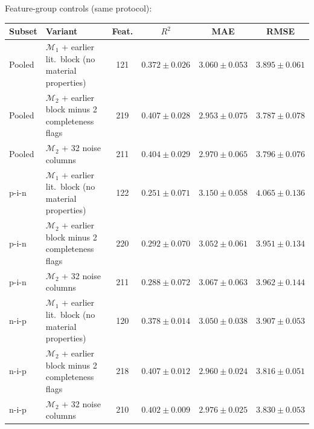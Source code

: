 \documentclass[10pt]{article}
\begin{document}
\noindent Feature-group controls (same protocol):\par\smallskip\begin{tabular}{llcccc}\toprule Subset & Variant & Feat. & $R^2$ & MAE & RMSE\\\midrule
Pooled & $\mathcal{M}_1$ + earlier lit.\ block (no material properties) & 121 & $0.372\pm0.026$ & $3.060\pm0.053$ & $3.895\pm0.061$\\
Pooled & $\mathcal{M}_2$ + earlier block minus 2 completeness flags & 219 & $0.407\pm0.028$ & $2.953\pm0.075$ & $3.787\pm0.078$\\
Pooled & $\mathcal{M}_2$ + 32 noise columns & 211 & $0.404\pm0.029$ & $2.970\pm0.065$ & $3.796\pm0.076$\\
p-i-n & $\mathcal{M}_1$ + earlier lit.\ block (no material properties) & 122 & $0.251\pm0.071$ & $3.150\pm0.058$ & $4.065\pm0.136$\\
p-i-n & $\mathcal{M}_2$ + earlier block minus 2 completeness flags & 220 & $0.292\pm0.070$ & $3.052\pm0.061$ & $3.951\pm0.134$\\
p-i-n & $\mathcal{M}_2$ + 32 noise columns & 211 & $0.288\pm0.072$ & $3.067\pm0.063$ & $3.962\pm0.144$\\
n-i-p & $\mathcal{M}_1$ + earlier lit.\ block (no material properties) & 120 & $0.378\pm0.014$ & $3.050\pm0.038$ & $3.907\pm0.053$\\
n-i-p & $\mathcal{M}_2$ + earlier block minus 2 completeness flags & 218 & $0.407\pm0.012$ & $2.960\pm0.024$ & $3.816\pm0.051$\\
n-i-p & $\mathcal{M}_2$ + 32 noise columns & 210 & $0.402\pm0.009$ & $2.976\pm0.025$ & $3.830\pm0.053$\\
\bottomrule\end{tabular}\par\medskip
\end{document}

